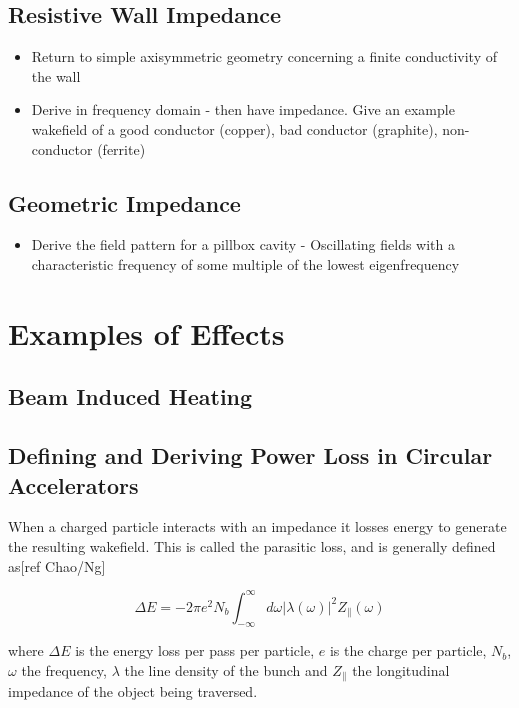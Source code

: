 \subsection{Resistive Wall Impedance}

\begin{itemize}
\item{Return to simple axisymmetric geometry concerning a finite conductivity of the wall}
\item{Derive in frequency domain - then have impedance. Give an example wakefield of a good conductor (copper), bad conductor (graphite), non-conductor (ferrite)}
\end{itemize}

\subsection{Geometric Impedance}
\begin{itemize}
\item{Derive the field pattern for a pillbox cavity - Oscillating fields with a characteristic frequency of some multiple of the lowest eigenfrequency}
\end{itemize}
\section{Examples of Effects}

\subsection{Beam Induced Heating}

\subsection{Defining and Deriving Power Loss in Circular Accelerators}
\label{sec:power_loss}

When a charged particle interacts with an impedance it losses energy to generate the resulting wakefield. This is called the parasitic loss, and is generally defined as[ref Chao/Ng]

\begin{equation}
\Delta E = -2\pi e^{2}N_{b}\int^{\infty}_{-\infty} d\omega \left| \lambda \left( \omega \right)  \right|^{2} Z_{\parallel} \left( \omega \right)
\end{equation}

where $\Delta E$ is the energy loss per pass per particle, $e$ is the charge per particle, $N_{b}$, $\omega$ the frequency, $\lambda$ the line density of the bunch and $Z_{\parallel}$ the longitudinal impedance of the object being traversed.
																
